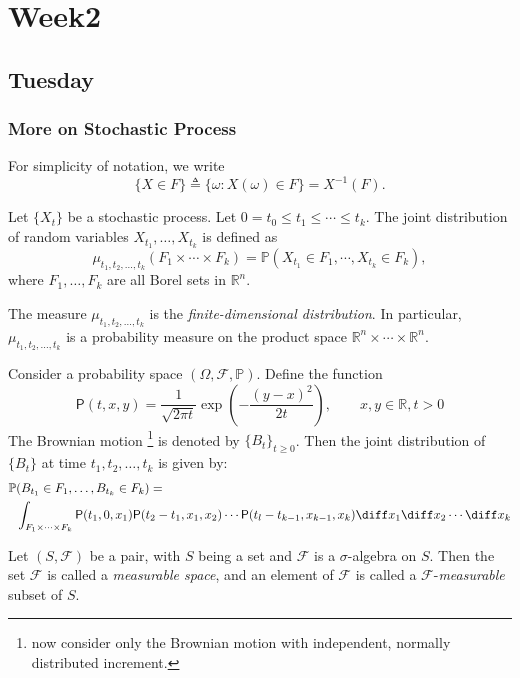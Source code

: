 
\chapter{Week2}

\section{Tuesday}
\subsection{More on Stochastic Process}
For simplicity of notation, we write
\[
\{X\in F\}\triangleq\{\omega: X(\omega)\in F\}=X^{-1}(F).
\]
\begin{definition}
Let $\{X_t\}$ be a stochastic process.
Let $0=t_0\le t_1\le\cdots\le t_k$.
The joint distribution of random variables 
$X_{t_1},\ldots,X_{t_k}$ is defined as
\[
\mu_{t_1,t_2,\dots,t_k}(F_1\times\cdots\times F_k)
=
\mathbb{P}(X_{t_1}\in F_1,\cdots,X_{t_k}\in F_k),
\]
where $F_1,\dots,F_k$ are all Borel sets in $\mathbb{R}^n$.
\end{definition}

\begin{remark}
The measure $\mu_{t_1,t_2,\dots,t_k}$ is the \emph{finite-dimensional distribution}. In particular, $\mu_{t_1,t_2,\dots,t_k}$ is a probability measure on the product space $\mathbb{R}^n\times\cdots\times\mathbb{R}^n$.
\end{remark}

\begin{example}
Consider a probability space $(\Omega,\mathcal{F},\mathbb{P})$. 
Define the function 
\[
\mathsf{P}(t,x,y)=\frac{1}{\sqrt{2\pi t}}\exp\left(
-\frac{(y-x)^2}{2t}\right),\qquad x,y\in\mathbb{R},t>0
\]
The Brownian motion
\footnote{now consider only the Brownian motion with independent, normally distributed increment.}
 is denoted by $\{B_t\}_{t\ge0}$.
Then the joint distribution of $\{B_t\}$ at time $t_1,t_2,\ldots,t_k$ is given by:
\[
\begin{aligned}
\mathbb{P}&(B_{t_1}\in F_1,\dots,B_{t_k}\in F_k)
=\\
&\int_{F_1\times\cdots\times F_k}
\mathsf{P}(t_1,0,x_1)
\mathsf{P}(t_2-t_1,x_1,x_2)
\cdots
\mathsf{P}(t_l-t_{k-1},x_{k-1},x_k)
\diff x_1\diff x_2\cdots \diff x_k
\end{aligned}
\]
\end{example}

\begin{definition}
Let $(S,\mathcal{F})$ be a pair, with $S$ being a set and $\mathcal{F}$ is a $\sigma$-algebra on $S$. Then the set $\mathcal{F}$ is called a \emph{measurable space}, and an element of $\mathcal{F}$ is called a $\mathcal{F}$-\emph{measurable} subset of $S$.
\end{definition}

